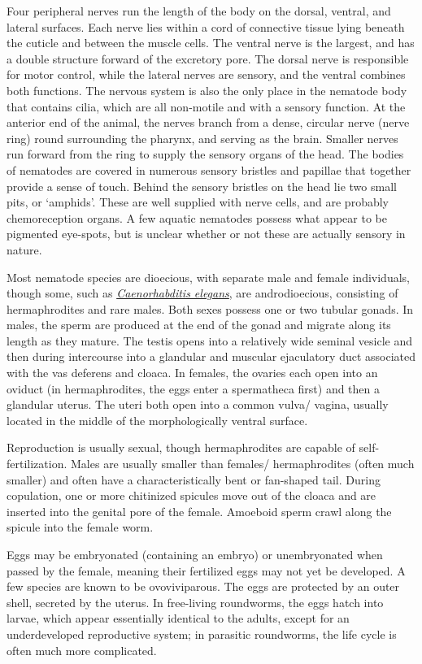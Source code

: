 Four peripheral nerves run the length of the body on the dorsal,
ventral, and lateral surfaces. Each nerve lies within a cord of
connective tissue lying beneath the cuticle and between the muscle
cells. The ventral nerve is the largest, and has a double structure
forward of the excretory pore. The dorsal nerve is responsible for motor
control, while the lateral nerves are sensory, and the ventral combines
both functions. The nervous system is also the only place in the
nematode body that contains cilia, which are all non-motile and with a
sensory function. At the anterior end of the animal, the nerves branch
from a dense, circular nerve (nerve ring) round surrounding the pharynx,
and serving as the brain. Smaller nerves run forward from the ring to
supply the sensory organs of the head. The bodies of nematodes are
covered in numerous sensory bristles and papillae that together provide
a sense of touch. Behind the sensory bristles on the head lie two small
pits, or `amphids'. These are well supplied with nerve cells, and are
probably chemoreception organs. A few aquatic nematodes possess what
appear to be pigmented eye-spots, but is unclear whether or not these
are actually sensory in nature.

Most nematode species are dioecious, with separate male and female
individuals, though some, such as
\href{https://en.wikipedia.org/wiki/Caenorhabditis_elegans}{\emph{Caenorhabditis
elegans}}, are androdioecious, consisting of hermaphrodites and rare
males. Both sexes possess one or two tubular gonads. In males, the sperm
are produced at the end of the gonad and migrate along its length as
they mature. The testis opens into a relatively wide seminal vesicle and
then during intercourse into a glandular and muscular ejaculatory duct
associated with the vas deferens and cloaca. In females, the ovaries
each open into an oviduct (in hermaphrodites, the eggs enter a
spermatheca first) and then a glandular uterus. The uteri both open into
a common vulva/ vagina, usually located in the middle of the
morphologically ventral surface.

Reproduction is usually sexual, though hermaphrodites are capable of
self-fertilization. Males are usually smaller than females/
hermaphrodites (often much smaller) and often have a characteristically
bent or fan-shaped tail. During copulation, one or more chitinized
spicules move out of the cloaca and are inserted into the genital pore
of the female. Amoeboid sperm crawl along the spicule into the female
worm.

Eggs may be embryonated (containing an embryo) or unembryonated when
passed by the female, meaning their fertilized eggs may not yet be
developed. A few species are known to be ovoviviparous. The eggs are
protected by an outer shell, secreted by the uterus. In free-living
roundworms, the eggs hatch into larvae, which appear essentially
identical to the adults, except for an underdeveloped reproductive
system; in parasitic roundworms, the life cycle is often much more
complicated.

